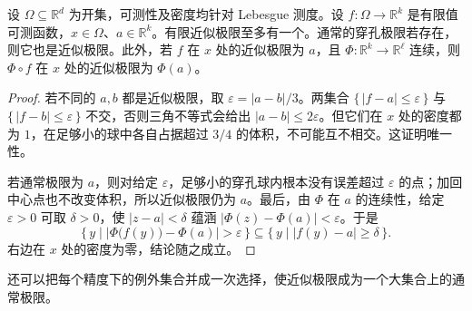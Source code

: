 \begin{proposition}
\label{b1:prop:approximate-limit-properties}
设 \(\Omega\subseteq\mathbb R^d\) 为开集，可测性及密度均针对 Lebesgue 测度。设 \(f:\Omega\to\mathbb R^k\) 是有限值可测函数，\(x\in\Omega\)、\(a\in\mathbb R^k\)。有限近似极限至多有一个。通常的穿孔极限若存在，则它也是近似极限。此外，若 \(f\) 在 \(x\) 处的近似极限为 \(a\)，且 \(\Phi:\mathbb R^k\rightarrow\mathbb R^\ell\) 连续，则 \(\Phi\circ f\) 在 \(x\) 处的近似极限为 \(\Phi(a)\)。
\end{proposition}
\begin{proof}
若不同的 \(a,b\) 都是近似极限，取 \(\varepsilon=|a-b|/3\)。两集合
\(\{\,|f-a|\leq\varepsilon\,\}\) 与 \(\{\,|f-b|\leq\varepsilon\,\}\) 不交，否则三角不等式会给出 \(|a-b|\leq2\varepsilon\)。但它们在 \(x\) 处的密度都为 \(1\)，在足够小的球中各自占据超过 \(3/4\) 的体积，不可能互不相交。这证明唯一性。

若通常极限为 \(a\)，则对给定 \(\varepsilon\)，足够小的穿孔球内根本没有误差超过 \(\varepsilon\) 的点；加回中心点也不改变体积，所以近似极限仍为 \(a\)。最后，由 \(\Phi\) 在 \(a\) 的连续性，给定 \(\varepsilon>0\) 可取 \(\delta>0\)，使 \(|z-a|<\delta\) 蕴涵 \(|\Phi(z)-\Phi(a)|<\varepsilon\)。于是
\[
\{\,y\mid |\Phi\bigl(f(y)\bigr)-\Phi(a)|>\varepsilon\,\}
\subseteq\{\,y\mid |f(y)-a|\geq\delta\,\}.
\]
右边在 \(x\) 处的密度为零，结论随之成立。
\end{proof}

还可以把每个精度下的例外集合并成一次选择，使近似极限成为一个大集合上的通常极限。

